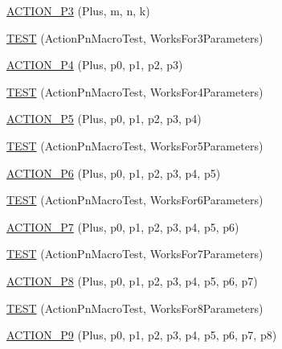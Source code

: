\begin{DoxyCompactItemize}
\item 
\hyperlink{namespacetesting_1_1gmock__generated__actions__test_a35c62beac532eaff7e54b8ad4a7fe1cf}{A\+C\+T\+I\+O\+N\+\_\+\+P3} (Plus, m, n, k)
\item 
\hyperlink{namespacetesting_1_1gmock__generated__actions__test_a3579cf2428f584d2a837c2c219ec1d5a}{T\+E\+ST} (Action\+Pn\+Macro\+Test, Works\+For3\+Parameters)
\item 
\hyperlink{namespacetesting_1_1gmock__generated__actions__test_ac86e9e1fa5be82823e80247ba093301c}{A\+C\+T\+I\+O\+N\+\_\+\+P4} (Plus, p0, p1, p2, p3)
\item 
\hyperlink{namespacetesting_1_1gmock__generated__actions__test_a6c13e382007960236763d638542bc5fe}{T\+E\+ST} (Action\+Pn\+Macro\+Test, Works\+For4\+Parameters)
\item 
\hyperlink{namespacetesting_1_1gmock__generated__actions__test_a948863fb38d913f02a0c5bde6be0b0a0}{A\+C\+T\+I\+O\+N\+\_\+\+P5} (Plus, p0, p1, p2, p3, p4)
\item 
\hyperlink{namespacetesting_1_1gmock__generated__actions__test_a132cab07373e037a06807a5948b1410b}{T\+E\+ST} (Action\+Pn\+Macro\+Test, Works\+For5\+Parameters)
\item 
\hyperlink{namespacetesting_1_1gmock__generated__actions__test_a97cbcc90a3063a1882886ded61fc8979}{A\+C\+T\+I\+O\+N\+\_\+\+P6} (Plus, p0, p1, p2, p3, p4, p5)
\item 
\hyperlink{namespacetesting_1_1gmock__generated__actions__test_a9031cb5f0e3d9de21ed3ff0a98a311d4}{T\+E\+ST} (Action\+Pn\+Macro\+Test, Works\+For6\+Parameters)
\item 
\hyperlink{namespacetesting_1_1gmock__generated__actions__test_a58bc376a0637fc1e89e6503466d1b9cd}{A\+C\+T\+I\+O\+N\+\_\+\+P7} (Plus, p0, p1, p2, p3, p4, p5, p6)
\item 
\hyperlink{namespacetesting_1_1gmock__generated__actions__test_add3cba52186c7ce384808c222492ee18}{T\+E\+ST} (Action\+Pn\+Macro\+Test, Works\+For7\+Parameters)
\item 
\hyperlink{namespacetesting_1_1gmock__generated__actions__test_ad8766a6dbaeffbf36658d3b5f75d3b00}{A\+C\+T\+I\+O\+N\+\_\+\+P8} (Plus, p0, p1, p2, p3, p4, p5, p6, p7)
\item 
\hyperlink{namespacetesting_1_1gmock__generated__actions__test_a1913bedf1d5cf736e91f2be119de0d5f}{T\+E\+ST} (Action\+Pn\+Macro\+Test, Works\+For8\+Parameters)
\item 
\hyperlink{namespacetesting_1_1gmock__generated__actions__test_ab023ad5e95ca2c2b8845963ce7222e00}{A\+C\+T\+I\+O\+N\+\_\+\+P9} (Plus, p0, p1, p2, p3, p4, p5, p6, p7, p8)

\end{DoxyCompactItemize}
